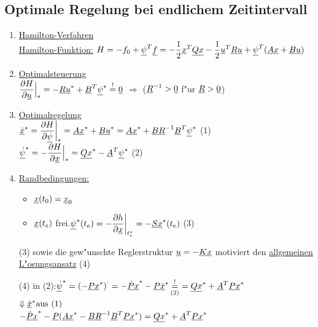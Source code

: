 \documentclass[openany,a4paper,11pt]{book}
\begin{document}
\subsection{Optimale Regelung bei endlichem Zeitintervall}
\begin{enumerate}
    \item \uline{Hamilton-Verfahren} \\[2pt]
    \uline{Hamilton-Funktion:} $\displaystyle H=-f_0+\uline{\psi}^T\uline{f}=-\frac{1}{2}\uline{x}^T\uline{Qx}-\frac{1}{2}\uline{u}^T\uline{Ru}+\uline{\psi}^T(\uline{Ax}+\uline{Bu})$
    \item \uline{Optimalsteuerung}\\[2pt]
    $\displaystyle\frac{\partial H}{\partial \uline{u}}\Big|_*=-\uline{Ru}^*+\uline{B}^T\uline{\psi}^*\stackrel{!}{=}\uline{0}$ $\Rightarrow$  ($\uline{R}^{-1}>\uline{0}$ f"ur $\uline{R}>\uline{0}$)
    \item \uline{Optimalregelung}\\[2pt]
    $\displaystyle \uline{\dot{x}}^*=\frac{\partial H}{\partial \uline{\psi}}\bigg|_*=\uline{Ax}^*+\uline{Bu}^*=\uline{Ax}^*+\uline{BR}^{-1}\uline{B}^T\uline{\psi}^*$ \quad (1)\\
    $\displaystyle\uline{\dot{\psi}}^*=-\frac{\partial H}{\partial \uline{x}}\Big|_*=\uline{Qx}^*-\uline{A}^T\uline{\psi}^*$ \quad (2)
    \item \uline{Randbedingungen:} 
    \begin{itemize}
        \item $\uline{x}(t_0)=\uline{x}_0$
        \item $\uline{x}(t_e)$ frei.\quad $\displaystyle\uline{\psi}^*(t_e)=-\frac{\partial h}{\partial \uline{x}}\bigg|_{t_e^*}=-\uline{Sx}^*(t_e)$ \quad (3)\\
    \end{itemize}
    (3) sowie die gew"unschte Reglerstruktur $\uline{u}=-\uline{Kx}$ motiviert den \uline{allgemeinen L"osungsansatz}  \quad (4) \\
    \begin{center} 
    (4) in (2):\quad  $\uline{\dot{\psi}}^*={(-\uline{Px}^*)}^\cdot=-\uline{\dot{P}x}^*-\uline{P\dot{x}}^*\mathop{=}\limits_{(2)}^!=\uline{Qx}^*+\uline{A}^T\uline{Px}^* $\\
    $\Downarrow \uline{\dot{x}}^* \text{aus (1)}$\\
    $-\uline{\dot{P}x}^*-\uline{P}(\uline{Ax}^*-\uline{BR}^{-1}\uline{B}^T\uline{Px}^*)=\uline{Qx}^*+\uline{A}^T\uline{Px}^*$\\

\end{center}
\end{enumerate}
\end{document}
